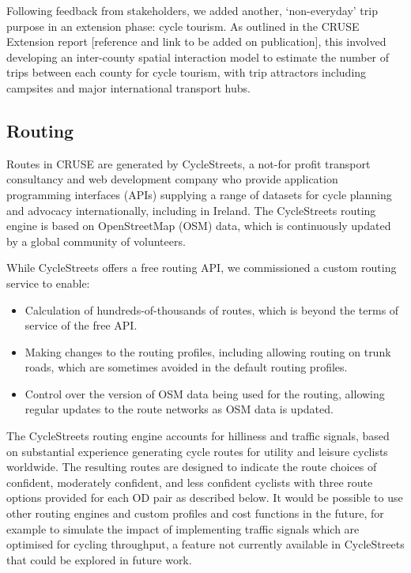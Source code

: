 \documentclass[
  super,
  preprint,
  3p]{elsarticle}
\providecommand{\tightlist}{%
  \setlength{\itemsep}{0pt}\setlength{\parskip}{0pt}}\usepackage{longtable,booktabs,array}
\begin{document}
\endgroup{}

Following feedback from stakeholders, we added another, `non-everyday'
trip purpose in an extension phase: cycle tourism. As outlined in the
CRUSE Extension report {[}reference and link to be added on
publication{]}, this involved developing an inter-county spatial
interaction model to estimate the number of trips between each county
for cycle tourism, with trip attractors including campsites and major
international transport hubs.

\subsection{Routing}\label{routing}

Routes in CRUSE are generated by CycleStreets, a not-for profit
transport consultancy and web development company who provide
application programming interfaces (APIs) supplying a range of datasets
for cycle planning and advocacy internationally, including in Ireland.
The CycleStreets routing engine is based on OpenStreetMap (OSM) data,
which is continuously updated by a global community of volunteers.

While CycleStreets offers a free routing API, we commissioned a custom
routing service to enable:

\begin{itemize}
\tightlist
\item
  Calculation of hundreds-of-thousands of routes, which is beyond the
  terms of service of the free API.
\item
  Making changes to the routing profiles, including allowing routing on
  trunk roads, which are sometimes avoided in the default routing
  profiles.
\item
  Control over the version of OSM data being used for the routing,
  allowing regular updates to the route networks as OSM data is updated.
\end{itemize}

The CycleStreets routing engine accounts for hilliness and traffic
signals, based on substantial experience generating cycle routes for
utility and leisure cyclists worldwide. The resulting routes are
designed to indicate the route choices of confident, moderately
confident, and less confident cyclists with three route options provided
for each OD pair as described below. It would be possible to use other
routing engines and custom profiles and cost functions in the future,
for example to simulate the impact of implementing traffic signals which
are optimised for cycling throughput, a feature not currently available
in CycleStreets that could be explored in future work.
\end{document}
